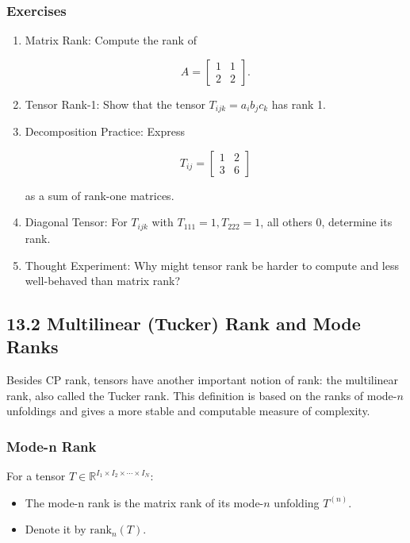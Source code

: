 \documentclass[
  letterpaper,
  DIV=11,
  numbers=noendperiod]{scrreprt}
\providecommand{\tightlist}{%
  \setlength{\itemsep}{0pt}\setlength{\parskip}{0pt}}
\begin{document}
\subsubsection{Exercises}\label{exercises-46}

\begin{enumerate}
\def\labelenumi{\arabic{enumi}.}
\item
  Matrix Rank: Compute the rank of

  \[
  A = \begin{bmatrix}1 & 1 \\ 2 & 2\end{bmatrix}.
  \]
\item
  Tensor Rank-1: Show that the tensor \(T_{ijk} = a_i b_j c_k\) has rank
  1.
\item
  Decomposition Practice: Express

  \[
  T_{ij} = \begin{bmatrix}1 & 2 \\ 3 & 6\end{bmatrix}
  \]

  as a sum of rank-one matrices.
\item
  Diagonal Tensor: For \(T_{ijk}\) with \(T_{111}=1, T_{222}=1\), all
  others 0, determine its rank.
\item
  Thought Experiment: Why might tensor rank be harder to compute and
  less well-behaved than matrix rank?
\end{enumerate}

\subsection{13.2 Multilinear (Tucker) Rank and Mode
Ranks}\label{multilinear-tucker-rank-and-mode-ranks}

Besides CP rank, tensors have another important notion of rank: the
multilinear rank, also called the Tucker rank. This definition is based
on the ranks of mode-\(n\) unfoldings and gives a more stable and
computable measure of complexity.

\subsubsection{Mode-n Rank}\label{mode-n-rank}

For a tensor
\(T \in \mathbb{R}^{I_1 \times I_2 \times \cdots \times I_N}\):

\begin{itemize}
\tightlist
\item
  The mode-n rank is the matrix rank of its mode-\(n\) unfolding
  \(T^{(n)}\).
\item
  Denote it by \(\text{rank}_n(T)\).
\end{itemize}
\end{document}
